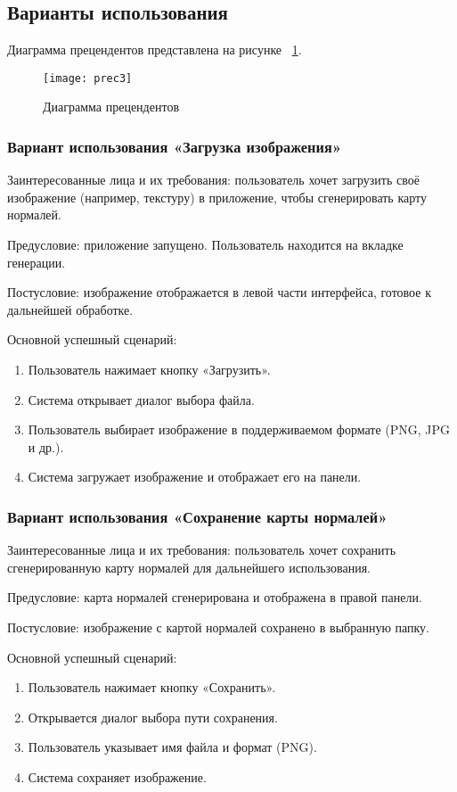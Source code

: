 \subsection{Варианты использования}

Диаграмма прецендентов представлена на рисунке ~\ref{prec3:image}.

\begin{figure}[ht]
	\texttt{[image: prec3]}
	\caption{Диаграмма прецендентов}
	\label{prec3:image}
\end{figure}
\subsubsection{Вариант использования «Загрузка изображения»}

Заинтересованные лица и их требования: пользователь хочет загрузить своё изображение (например, текстуру) в приложение, чтобы сгенерировать карту нормалей.

Предусловие: приложение запущено. Пользователь находится на вкладке генерации.

Постусловие: изображение отображается в левой части интерфейса, готовое к дальнейшей обработке.

Основной успешный сценарий:
\begin{enumerate}
	\item Пользователь нажимает кнопку «Загрузить».
	\item Система открывает диалог выбора файла.
	\item Пользователь выбирает изображение в поддерживаемом формате (PNG, JPG и др.).
	\item Система загружает изображение и отображает его на панели.
\end{enumerate}
\subsubsection{Вариант использования «Сохранение карты нормалей»}

Заинтересованные лица и их требования: пользователь хочет сохранить сгенерированную карту нормалей для дальнейшего использования.

Предусловие: карта нормалей сгенерирована и отображена в правой панели.

Постусловие: изображение с картой нормалей сохранено в выбранную папку.

Основной успешный сценарий:
\begin{enumerate}
	\item Пользователь нажимает кнопку «Сохранить».
	\item Открывается диалог выбора пути сохранения.
	\item Пользователь указывает имя файла и формат (PNG).
	\item Система сохраняет изображение.
\end{enumerate}
